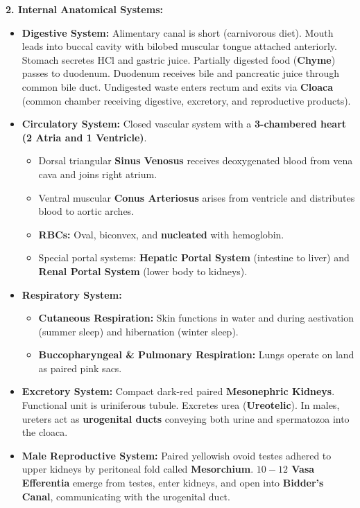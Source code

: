 \documentclass[10pt,twoside,openright]{book}
\begin{document}
\begin{conceptbox}
\textbf{2. Internal Anatomical Systems:}
\begin{itemize}
  \item \textbf{Digestive System:} Alimentary canal is short (carnivorous diet). Mouth leads into buccal cavity with bilobed muscular tongue attached anteriorly. Stomach secretes $\mathrm{HCl}$ and gastric juice. Partially digested food (\textbf{Chyme}) passes to duodenum. Duodenum receives bile and pancreatic juice through common bile duct. Undigested waste enters rectum and exits via \textbf{Cloaca} (common chamber receiving digestive, excretory, and reproductive products).
  \item \textbf{Circulatory System:} Closed vascular system with a \textbf{3-chambered heart (2 Atria and 1 Ventricle)}.
  \begin{itemize}
    \item Dorsal triangular \textbf{Sinus Venosus} receives deoxygenated blood from vena cava and joins right atrium.
    \item Ventral muscular \textbf{Conus Arteriosus} arises from ventricle and distributes blood to aortic arches.
    \item \textbf{RBCs:} Oval, biconvex, and \textbf{nucleated} with hemoglobin.
    \item Special portal systems: \textbf{Hepatic Portal System} (intestine to liver) and \textbf{Renal Portal System} (lower body to kidneys).
  \end{itemize}
  \item \textbf{Respiratory System:}
  \begin{itemize}
    \item \textbf{Cutaneous Respiration:} Skin functions in water and during aestivation (summer sleep) and hibernation (winter sleep).
    \item \textbf{Buccopharyngeal \& Pulmonary Respiration:} Lungs operate on land as paired pink sacs.
  \end{itemize}
  \item \textbf{Excretory System:} Compact dark-red paired \textbf{Mesonephric Kidneys}. Functional unit is uriniferous tubule. Excretes urea (\textbf{Ureotelic}). In males, ureters act as \textbf{urogenital ducts} conveying both urine and spermatozoa into the cloaca.
  \item \textbf{Male Reproductive System:} Paired yellowish ovoid testes adhered to upper kidneys by peritoneal fold called \textbf{Mesorchium}. \textbf{$10-12$ Vasa Efferentia} emerge from testes, enter kidneys, and open into \textbf{Bidder's Canal}, communicating with the urogenital duct.

\end{itemize}
\end{conceptbox}
\end{document}
